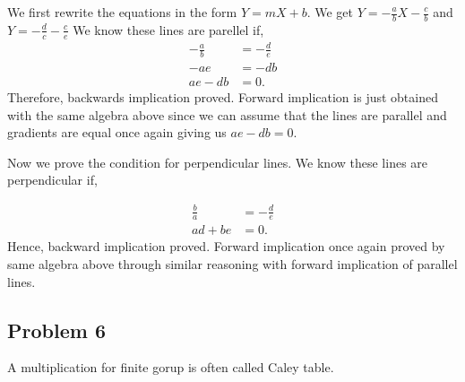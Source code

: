 \begin{solution}
  We first rewrite the equations in the form \( Y = mX + b \).
  We get \( Y = -\frac{a}{b}X - \frac{c}{b} \) and \( Y  = -\frac{d}{c} - \frac{c}{e}\)
  We know these lines are parellel if,
  \begin{align*}
    -\frac{a}{b} &= -\frac{d}{e} \\
    -ae &= -db \\
    ae - db &= 0
  .\end{align*}
  Therefore, backwards implication proved. Forward implication is just obtained 
  with the same algebra above since we can assume that the lines are parallel and gradients are equal once again giving us \( ae - db = 0 \).

  Now we prove the condition for perpendicular lines. We know these lines
  are perpendicular if,

  \begin{align*}
    \frac{b}{a} &= -\frac{d}{e} \\
  ad + be &= 0 
  .\end{align*}
  Hence, backward implication proved. Forward implication
  once again proved by same algebra above through similar reasoning with
  forward implication of parallel lines.
\end{solution}

\subsection{Problem 6}
A multiplication for finite gorup is often called Caley table. 




